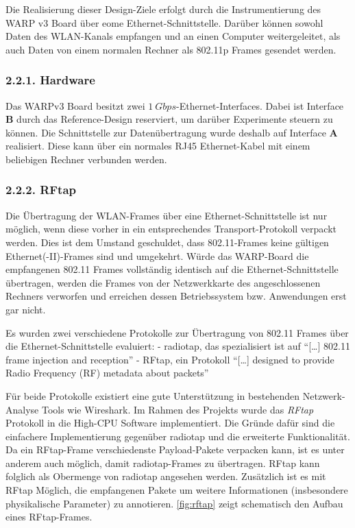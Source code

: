 \documentclass[ngerman,]{scrartcl}
\begin{document}
Die Realisierung dieser Design-Ziele erfolgt durch die Instrumentierung
des WARP v3 Board über eome Ethernet-Schnittstelle. Darüber können
sowohl Daten des WLAN-Kanals empfangen und an einen Computer
weitergeleitet, als auch Daten von einem normalen Rechner als 802.11p
Frames gesendet werden.

\subsubsection{2.2.1. Hardware}\label{hardware}

Das WARPv3 Board besitzt zwei \(\SI{1}{Gbps}\)-Ethernet-Interfaces.
Dabei ist Interface \textbf{B} durch das Reference-Design reserviert, um
darüber Experimente steuern zu können\autocite{warp-exp}. Die
Schnittstelle zur Datenübertragung wurde deshalb auf Interface
\textbf{A} realisiert. Diese kann über ein normales RJ45 Ethernet-Kabel
mit einem beliebigen Rechner verbunden werden.

\subsubsection{2.2.2. RFtap}\label{rftap}

Die Übertragung der WLAN-Frames über eine Ethernet-Schnittstelle ist nur
möglich, wenn diese vorher in ein entsprechendes Transport-Protokoll
verpackt werden. Dies ist dem Umstand geschuldet, dass 802.11-Frames
keine gültigen Ethernet(-II)-Frames sind und umgekehrt. Würde das
WARP-Board die empfangenen 802.11 Frames vollständig identisch auf die
Ethernet-Schnittstelle übertragen, werden die Frames von der
Netzwerkkarte des angeschlossenen Rechners verworfen und erreichen
dessen Betriebssystem bzw. Anwendungen erst gar nicht.

Es wurden zwei verschiedene Protokolle zur Übertragung von 802.11 Frames
über die Ethernet-Schnittstelle evaluiert: - radiotap, das spezialisiert
ist auf ``{[}\ldots{}{]} 802.11 frame injection and
reception''\autocite{radiotap} - RFtap, ein Protokoll ``{[}\ldots{}{]}
designed to provide Radio Frequency (RF) metadata about
packets''\autocite{rftap}

Für beide Protokolle existiert eine gute Unterstützung in bestehenden
Netzwerk-Analyse Tools wie Wireshark. Im Rahmen des Projekts wurde das
\emph{RFtap} Protokoll in die High-CPU Software implementiert. Die
Gründe dafür sind die einfachere Implementierung gegenüber radiotap und
die erweiterte Funktionalität. Da ein RFtap-Frame verschiedenste
Payload-Pakete verpacken kann, ist es unter anderem auch möglich, damit
radiotap-Frames zu übertragen. RFtap kann folglich als Obermenge von
radiotap angesehen werden. Zusätzlich ist es mit RFtap Möglich, die
empfangenen Pakete um weitere Informationen (insbesondere physikalische
Parameter) zu annotieren. \cref{fig:rftap} zeigt
schematisch den Aufbau eines RFtap-Frames.
\end{document}
